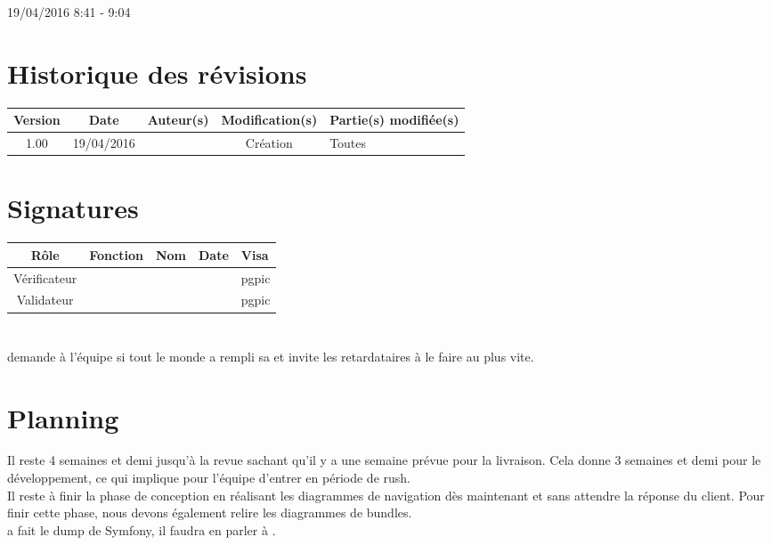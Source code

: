 \documentclass [a4paper] {article}
\begin{document}
19/04/2016			 				%
\hfill   
\hfill 	 8:41 - 9:04 				%



\section*{Historique des révisions}
\begin{center}
			\begin{tabular}{| c | c | c | c | p{4cm} |}
				\hline
				\rowcolor{Gray}
				Version & Date & Auteur(s) & Modification(s) & Partie(s) modifiée(s)		 \\
				\hline
				1.00 & 19/04/2016 & \Pierre & Création & Toutes \\
		\hline		
			\end{tabular}
		\end{center}

\section*{Signatures}

		\begin{center}
			\begin{tabular}{| c | c | c | c | p{4cm} |}
				\hline
				\rowcolor{Gray}
				Rôle & Fonction & Nom & Date & Visa		 \\
				\hline
				Vérificateur & \RQA & \Kafui &  & pgpic \\[30pt]
				\hline
				Validateur & \CP & \Sergi &  & pgpic \\[30pt]	
				\hline
			\end{tabular}
		\end{center}



\section{\FS}
\Sergi demande à l'équipe si tout le monde a rempli sa \FS{} et invite les retardataires à le faire au plus vite.


\section{Planning}
Il reste 4 semaines et demi jusqu'à la revue sachant qu'il y a une semaine prévue pour la livraison. Cela donne 3 semaines et demi pour le développement, ce qui implique pour l'équipe d'entrer en période de rush. \\
Il reste à finir la phase de conception en réalisant les diagrammes de navigation dès maintenant et sans attendre la réponse du client. Pour finir cette phase, nous devons également relire les diagrammes de bundles. \\
\Kafui{} a fait le dump de Symfony, il faudra en parler à \nomTuteurPedago. \\
\end{document}
